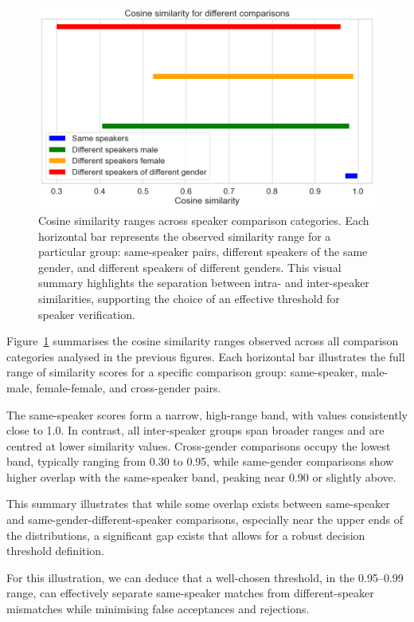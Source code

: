\documentclass[conference]{IEEEtran}
\begin{document}
	\begin{figure}[H]
		\centering
		\includegraphics[width=1\linewidth]{img/img-similarity-comparison}
		\caption{Cosine similarity ranges across speaker comparison categories. Each horizontal bar represents the observed similarity range for a particular group: same-speaker pairs, different speakers of the same gender, and different speakers of different genders. This visual summary highlights the separation between intra- and inter-speaker similarities, supporting the choice of an effective threshold for speaker verification.}
		\label{fig:img-similarity-comparison}
	\end{figure}
	
	Figure~\ref{fig:img-similarity-comparison} summarises the cosine similarity ranges observed across all comparison categories analysed in the previous figures. Each horizontal bar illustrates the full range of similarity scores for a specific comparison group: same-speaker, male-male, female-female, and cross-gender pairs.
	
	The same-speaker scores form a narrow, high-range band, with values consistently close to 1.0. In contrast, all inter-speaker groups span broader ranges and are centred at lower similarity values. Cross-gender comparisons occupy the lowest band, typically ranging from 0.30 to 0.95, while same-gender comparisons show higher overlap with the same-speaker band, peaking near 0.90 or slightly above.
	
	This summary illustrates that while some overlap exists between same-speaker and same-gender-different-speaker comparisons, especially near the upper ends of the distributions, a significant gap exists that allows for a robust decision threshold definition.
	
	For this illustration, we can deduce that a well-chosen threshold, in the 0.95–0.99 range, can effectively separate same-speaker matches from different-speaker mismatches while minimising false acceptances and rejections.
	
\end{document}
